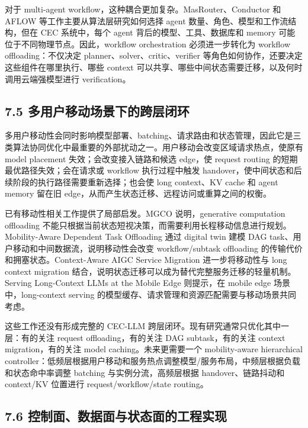 \documentclass[a4paper,10pt]{ctexart}
\begin{document}
对于 multi-agent workflow，这种耦合更加复杂。MasRouter、Conductor 和 AFLOW 等工作主要从算法层研究如何选择 agent 数量、角色、模型和工作流结构，但在 CEC 系统中，每个 agent 背后的模型、工具、数据库和 memory 可能位于不同物理节点。因此，workflow orchestration 必须进一步转化为 workflow offloading：不仅决定 planner、solver、critic、verifier 等角色如何协作，还要决定这些组件在哪里执行、哪些 context 可以共享、哪些中间状态需要迁移，以及何时调用云端强模型进行 verification。


\subsection*{7.5 多用户移动场景下的跨层闭环}

多用户移动性会同时影响模型部署、batching、请求路由和状态管理，因此它是三类算法协同优化中最重要的外部扰动之一。用户移动会改变区域请求热点，使原有 model placement 失效；会改变接入链路和候选 edge，使 request routing 的短期最优路径失效；会在请求或 workflow 执行过程中触发 handover，使中间状态和后续阶段的执行路径需要重新选择；也会使 long context、KV cache 和 agent memory 留在旧 edge，从而产生状态迁移、远程访问或重算之间的权衡。


已有移动性相关工作提供了局部启发。MGCO 说明，generative computation offloading 不能只根据当前状态短视决策，而需要利用长程移动信息进行规划。Mobility-Aware Dependent Task Offloading 通过 digital twin 建模 DAG task、用户移动和中间数据流，说明移动性会改变 workflow/subtask offloading 的传输代价和拥塞状态。Context-Aware AIGC Service Migration 进一步将移动性与 long context migration 结合，说明状态迁移可以成为替代完整服务迁移的轻量机制。Serving Long-Context LLMs at the Mobile Edge 则提示，在 mobile edge 场景中，long-context serving 的模型缓存、请求管理和资源匹配需要与移动场景共同考虑。


这些工作还没有形成完整的 CEC-LLM 跨层闭环。现有研究通常只优化其中一层：有的关注 request offloading，有的关注 DAG subtask，有的关注 context migration，有的关注 model caching。未来更需要一个 mobility-aware hierarchical controller：低频层根据用户移动和服务热点调整模型/服务布局，中频层根据负载和状态命中率调整 batching 与实例分流，高频层根据 handover、链路抖动和 context/KV 位置进行 request/workflow/state routing。


\subsection*{7.6 控制面、数据面与状态面的工程实现}
\end{document}
